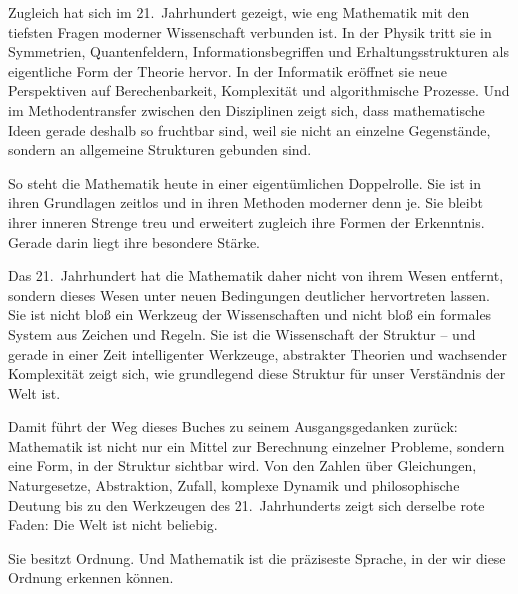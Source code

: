 Zugleich hat sich im 21.~Jahrhundert gezeigt,
wie eng Mathematik mit den tiefsten Fragen moderner Wissenschaft verbunden ist.
In der Physik tritt sie in Symmetrien,
Quantenfeldern,
Informationsbegriffen
und Erhaltungsstrukturen
als eigentliche Form der Theorie hervor.
In der Informatik eröffnet sie neue Perspektiven
auf Berechenbarkeit,
Komplexität
und algorithmische Prozesse.
Und im Methodentransfer zwischen den Disziplinen zeigt sich,
dass mathematische Ideen gerade deshalb so fruchtbar sind,
weil sie nicht an einzelne Gegenstände,
sondern an allgemeine Strukturen gebunden sind.

So steht die Mathematik heute in einer eigentümlichen Doppelrolle.
Sie ist in ihren Grundlagen zeitlos
und in ihren Methoden moderner denn je.
Sie bleibt ihrer inneren Strenge treu
und erweitert zugleich ihre Formen der Erkenntnis.
Gerade darin liegt ihre besondere Stärke.

Das 21.~Jahrhundert hat die Mathematik daher nicht von ihrem Wesen entfernt,
sondern dieses Wesen unter neuen Bedingungen deutlicher hervortreten lassen.
Sie ist nicht bloß ein Werkzeug der Wissenschaften
und nicht bloß ein formales System aus Zeichen und Regeln.
Sie ist die Wissenschaft der Struktur --
und gerade in einer Zeit intelligenter Werkzeuge,
abstrakter Theorien
und wachsender Komplexität zeigt sich,
wie grundlegend diese Struktur für unser Verständnis der Welt ist.

\medskip

Damit führt der Weg dieses Buches zu seinem Ausgangsgedanken zurück:
Mathematik ist nicht nur ein Mittel zur Berechnung einzelner Probleme,
sondern eine Form,
in der Struktur sichtbar wird.
Von den Zahlen über Gleichungen,
Naturgesetze,
Abstraktion,
Zufall,
komplexe Dynamik
und philosophische Deutung
bis zu den Werkzeugen des 21.~Jahrhunderts zeigt sich derselbe rote Faden:
Die Welt ist nicht beliebig.

Sie besitzt Ordnung.
Und Mathematik ist die präziseste Sprache,
in der wir diese Ordnung erkennen können.